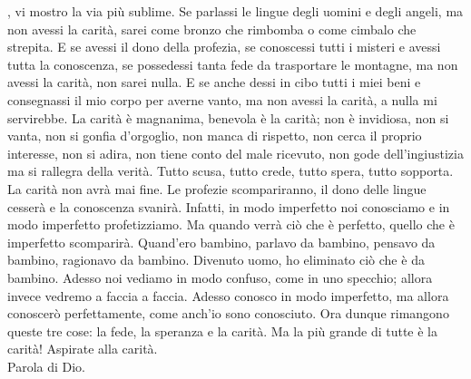 , vi mostro la via pi\`u sublime. Se
parlassi le lingue degli uomini e
degli angeli, ma non avessi la carit\`a, sarei come bronzo
che rimbomba o come cimbalo che strepita.
E se avessi il dono della profezia, se conoscessi tutti
i misteri e avessi tutta la conoscenza, se
possedessi tanta fede da trasportare le montagne, ma non
avessi la carit\`a, non sarei nulla. E se
anche dessi in cibo tutti i miei beni e consegnassi il
mio corpo per averne vanto, ma non avessi la
carit\`a, a nulla mi servirebbe. La carit\`a \`e magnanima,
benevola \`e la carit\`a; non \`e invidiosa,
non si vanta, non si gonfia d'orgoglio, non manca di rispetto,
non cerca il proprio interesse, non si adira,
non tiene conto del male ricevuto, non gode dell'ingiustizia
ma si rallegra della verit\`a. Tutto scusa,
tutto crede, tutto spera, tutto sopporta. La carit\`a
non avr\`a mai fine. Le profezie scompariranno, il
dono delle lingue cesser\`a e la conoscenza svanir\`a.
Infatti, in modo imperfetto noi conosciamo e in modo
imperfetto profetizziamo. Ma quando verr\`a ci\`o che \`e
perfetto, quello che \`e imperfetto scomparir\`a.
Quand'ero bambino, parlavo da bambino, pensavo da bambino,
ragionavo da bambino. Divenuto uomo, ho
eliminato ci\`o che \`e da bambino. Adesso noi vediamo
in modo confuso, come in uno specchio; allora
invece vedremo a faccia a faccia. Adesso conosco in modo
imperfetto, ma allora conoscer\`o perfettamente,
come anch'io sono conosciuto. Ora dunque rimangono queste
tre cose: la fede, la speranza e la carit\`a.
Ma la pi\`u grande di tutte \`e la carit\`a! Aspirate alla carit\`a.\\

Parola di Dio.\\


\vspace{10mm}


\newpage


